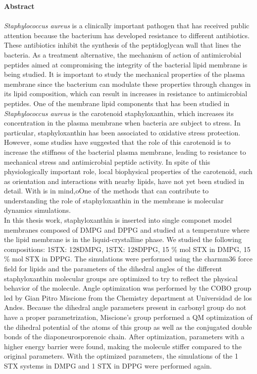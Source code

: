 \documentclass[12pt]{article}
\begin{document}
\textbf{\LARGE Abstract}\\\\
\textit{Staphylococcus aureus} is a clinically important pathogen that has received public attention because the bacterium has developed resistance to different antibiotics. These antibiotics inhibit the synthesis of the peptidoglycan wall that lines the bacteria. As a treatment alternative, the mechanism of action of antimicrobial peptides aimed at compromising the integrity of the bacterial lipid membrane is being studied. It is important to study the mechanical properties of the plasma membrane since the bacterium can modulate these properties through changes in its lipid composition, which can result in increases in resistance to antimicrobial peptides. One of the membrane lipid components that has been studied in \textit{Staphylococcus aureus} is the carotenoid staphyloxanthin, which increases its concentration in the plasma membrane when bacteria are subject to stress. In particular, staphyloxanthin has been associated to oxidative stress protection. However, some studies have suggested that the role of this carotenoid is to increase the stiffness of the bacterial plasma membrane, leading to resistance to mechanical stress and antimicrobial peptide activity. In spite of this physiologically important role, local biophysical properties of the carotenoid, such as orientation and interactions with nearby lipids, have not yet been studied in detail. With is in mind,oOne of the methods that can contribute to understanding the role of staphyloxanthin in the membrane is molecular dynamics simulations.\\
In this thesis work, staphyloxanthin is inserted into single componet model membranes composed of DMPG and DPPG and studied at a temperature where the lipid membrane is in the liquid-crystalline phase. We studied the following compositions: 1STX: 128DMPG, 1STX: 128DPPG, 15 \% mol STX in DMPG, 15 \% mol STX in DPPG. The simulations were performed using the charmm36 force field for lipids and the parameters of the dihedral angles of the different staphyloxanthin molecular groups are optimized to try to reflect the physical behavior of the molecule. Angle optimization was performed by the COBO group led by Gian Pitro Miscione from the Chemistry department at Universidad de los Andes. Because the dihedral angle  parameters present in carbonyl group do not have a proper parametrization, Miscione's group performed a QM optimization of the dihedral potential of the atoms of this group as well as the conjugated double bonds of the diaponeurosporenoic chain. After optimization, parameters with a higher energy barrier were found, making the molecule stiffer compared to the original parameters. With the optimized parameters, the simulations of the 1 STX systems in DMPG and 1 STX in DPPG were performed again. \\
\end{document}
